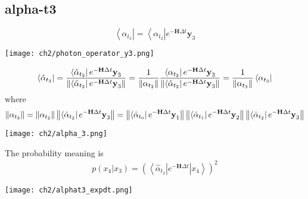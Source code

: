 \subsection{alpha-t3}
\begin{definition}
\begin{equation}
        \left< \alpha_{t_3} \right| = \left< \alpha_{t_2} \right| e^{-\textbf{H}\Delta t} \textbf{y}_3               
\end{equation}
\begin{center}
        \texttt{[image: ch2/photon\_operator\_y3.png]}   
\end{center}
\begin{equation}
        \left< \hat{\alpha}_{t_3} \right| 
	= \frac{\left< \hat{\alpha}_{t_2} \right| e^{-\textbf{H}\Delta t} \textbf{y}_3}{\left\lVert\left< \hat{\alpha}_{t_2} \right| e^{-\textbf{H}\Delta t} \textbf{y}_3\right\rVert} 
	= \frac{1}{\left\lVert\alpha_{t_{2}}\right\rVert} \frac{\left< \alpha_{t_2} \right| e^{-\textbf{H}\Delta t} \textbf{y}_3}{\left\lVert\left< \hat{\alpha}_{t_2} \right| e^{-\textbf{H}\Delta t} \textbf{y}_3\right\rVert} 
	= \frac{1}{\left\lVert\alpha_{t_3}\right\rVert} \left< \alpha_{t_3} \right|
\end{equation}
where
\begin{equation}
        \left\lVert\alpha_{t_3}\right\rVert = \left\lVert\alpha_{t_{2}}\right\rVert \left\lVert\left< \hat{\alpha}_{t_2} \right| e^{-\textbf{H}\Delta t} \textbf{y}_3\right\rVert 
        = \left\lVert\left < \hat{\alpha}_{t_{0}} \right| e^{-\textbf{H}\Delta t} \textbf{y}_1\right\rVert \left\lVert\left< \hat{\alpha}_{t_1} \right| e^{-\textbf{H}\Delta t} \textbf{y}_2\right\rVert \left\lVert\left < \hat{\alpha}_{t_{2}} \right| e^{-\textbf{H}\Delta t} \textbf{y}_3\right\rVert    
\end{equation}
\begin{center}
\texttt{[image: ch2/alpha\_3.png]}
\end{center}
\end{definition}

\begin{definition}
The probability meaning is 
\begin{align*}
        p(x_4|x_3) = (\left< \hat{\alpha}_{t_3}| e^{-\textbf{H}\Delta t} | x_4 \right>)^2
\end{align*}
\begin{center}
        \texttt{[image: ch2/alphat3\_expdt.png]}   
\end{center}
\end{definition}

